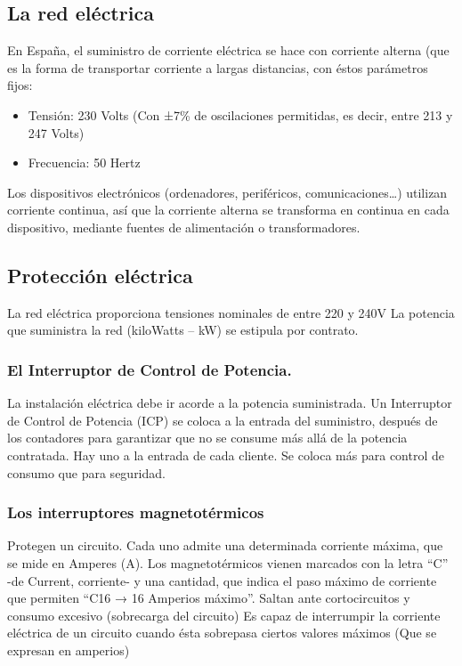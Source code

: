 \documentclass[a4paper]{article}
\begin{document}
\subsection{La red eléctrica}
\label{sec:org0000051}
En España, el suministro de corriente eléctrica se hace con corriente alterna (que es la forma de transportar corriente a largas distancias, con éstos parámetros fijos:
\begin{itemize}
\item Tensión: 230 Volts (Con ±7\% de oscilaciones permitidas, es decir, entre 213 y 247 Volts)
\item Frecuencia: 50 Hertz
\end{itemize}

Los dispositivos electrónicos (ordenadores, periféricos, comunicaciones…) utilizan corriente continua, así que la corriente alterna se transforma en continua en cada dispositivo, mediante fuentes de alimentación o transformadores.
\subsection{Protección eléctrica}
\label{sec:org0000066}
La red eléctrica proporciona tensiones nominales de entre 220 y 240V La potencia que suministra la red (kiloWatts – kW) se estipula por contrato.
\subsubsection{El Interruptor de Control de Potencia.}
\label{sec:org0000054}
La instalación eléctrica debe ir acorde a la potencia suministrada. Un Interruptor de Control de Potencia (ICP) se coloca a la entrada del suministro, después de los contadores para garantizar que no se consume más allá de la potencia contratada. Hay uno a la entrada de cada cliente. Se coloca más para control de consumo que para seguridad.
\subsubsection{Los interruptores magnetotérmicos}
\label{sec:org0000057}
Protegen un circuito. Cada uno admite una determinada corriente máxima, que se mide en Amperes (A). Los magnetotérmicos vienen marcados con la letra “C” -de Current, corriente- y una cantidad, que indica el paso máximo de corriente que permiten “C16 → 16 Amperios máximo”. Saltan ante cortocircuitos y consumo excesivo (sobrecarga del circuito)
Es capaz de interrumpir la corriente eléctrica de un circuito cuando ésta sobrepasa ciertos valores máximos (Que se expresan en amperios)
\end{document}
